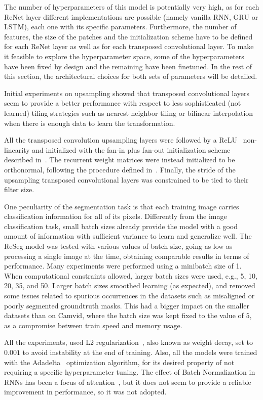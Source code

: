 The number of hyperparameters of this model is potentially very high, as for
each ReNet layer different implementations are possible (namely vanilla RNN,
GRU or LSTM), each one with its specific parameters. Furthermore, the number of
features, the size of the patches and the initialization scheme have to be
defined for each ReNet layer as well as for each transposed convolutional
layer. To make it feasible to explore the hyperparameter space, some of the
hyperparameters have been fixed by design and the remaining have been
finetuned.
In the rest of this section, the architectural choices for both
sets of parameters will be detailed.

Initial experiments on upsampling showed that transposed convolutional layers
seem to provide a better performance with respect to less sophisticated (not
learned) tiling strategies such as nearest neighbor tiling or bilinear
interpolation when there is enough data to learn the transformation.

All the transposed convolution upsampling layers were followed by a
ReLU~\cite{Krizhevsky2012-alexnet} non-linearity and initialized with the
fan-in plus fan-out initialization scheme described
in~\cite{glorot2010understanding}. The recurrent weight matrices were instead
initialized to be orthonormal, following the procedure defined
in~\cite{Saxe2014}. Finally, the stride of the upsampling transposed
convolutional layers was constrained to be tied to their filter size.

One peculiarity of the segmentation task is that each training image carries
classification information for all of its pixels. Differently from the image
classification task, small batch sizes already provide the model with a good
amount of information with sufficient variance to learn and generalize well.
The ReSeg model was tested with various values of batch size, going as low as
processing a single image at the time, obtaining comparable results in terms of
performance. Many experiments were performed using a minibatch size of 1. When
computational constraints allowed, larger batch sizes were used, e.g., 5, 10,
20, 35, and 50. Larger batch sizes smoothed learning (as expected), and removed
some issues related to spurious occurrences in the datasets such as misaligned
or poorly segmented groundtruth masks. This had a bigger impact on the smaller
datasets than on Camvid, where the batch size was kept fixed to the value of
$5$, as a compromise between train speed and memory usage.

All the experiments, used L2 regularization~\cite{Krogh92asimple}, also known
as weight decay, set to $0.001$ to avoid instability at the end of training.
Also, all the models were trained with the Adadelta~\cite{Zeiler-2012}
optimization algorithm, for its desired property of not requiring a specific
hyperparameter tuning. The effect of Batch Normalization in RNNs has been a
focus of attention~\cite{Laurent2015}, but it does not seem to provide a
reliable improvement in performance, so it was not adopted.

